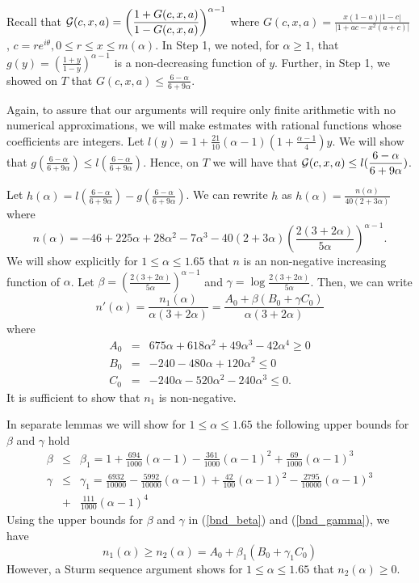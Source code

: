 \documentclass[12pt]{article}
\newcommand{\ds}{\displaystyle}
\begin{document}
Recall that ${\ds {\cal G}(c,x,a) = \left ( \frac{1+G(c,x,a)}{1-G(c,x,a)} \right ) ^{\alpha-1}}$ where  
${\ds G(c,x,a) = \frac{x(1-a)|1-c|}{|1+ac-x^2(a+c)|}}$, $c = re^{i\theta}, 0 \le r \le x \le m(\alpha)$. 
In Step 1, we noted, for $\alpha \ge 1$, that 
${\ds g(y) = \left ( \frac{1+y}{1-y} \right ) ^{\alpha-1}}$  is a non-decreasing function of $y$.  
Further, in Step 1, we showed on $T$ that ${\ds G(c,x,a) \le \frac{6-\alpha}{6+9\alpha}}$.

Again, to assure that our arguments will require only finite arithmetic with no numerical approximations, we will make estmates with rational functions whose coefficients are integers. Let ${\ds l(y) = 1 +\frac{21}{10}(\alpha-1)(1+\frac{\alpha-1}{4})y}$. We will show that ${\ds g(\frac{6-\alpha}{6+9\alpha}) \le l(\frac{6-\alpha}{6+9\alpha})}$.  Hence, on $T$ we will have that ${\ds {\cal G}(c,x,a) \le l(\frac{6-\alpha}{6+9\alpha}})$.

Let ${\ds h(\alpha) = l(\frac{6-\alpha}{6+9\alpha}) - g(\frac{6-\alpha}{6+9\alpha}) }$.  We can rewrite $h$ as 
${\ds h(\alpha) = \frac{n(\alpha)}{40(2+3\alpha)} }$ where
$$
n(\alpha) = -46 + 225\alpha + 28\alpha^2 - 7\alpha^3 -40(2+3\alpha)\left( \frac{2(3+2\alpha)}{5\alpha} \right)^{\alpha-1}.
$$
We will show explicitly for $1 \le \alpha \le 1.65$ that $n$ is an non-negative increasing function of $\alpha$.
Let ${\ds \beta = \left( \frac{2(3+2\alpha)}{5\alpha} \right)^{\alpha-1} }$ and ${\ds \gamma = \log \frac{2(3+2\alpha)}{5\alpha} }$.  Then, we can write
$$
n'(\alpha) = \frac{n_1(\alpha)}{\alpha(3+2\alpha)} =\frac{A_0  + \beta(B_0  +\gamma C_0)}{\alpha(3+2\alpha)}
$$
where
\begin{eqnarray*}
A_0 &=& 675\alpha + 618\alpha^2 +49\alpha^3 -42\alpha^4 \ge 0\\
B_0 &=& -240 -480\alpha+120\alpha^2 \le 0\\
C_0 &=& -240\alpha-520\alpha^2-240\alpha^3 \le 0.
\end{eqnarray*}
It is sufficient to show that $n_1$ is non-negative.

In separate lemmas we will show for $1 \le \alpha \le 1.65$ the following upper bounds for $\beta$ and $\gamma$ hold
\begin{eqnarray} \label{bnd_beta}
\beta &\le& \beta_1 = 1+\frac{694}{1000}(\alpha-1)-\frac{361}{1000}(\alpha-1)^2+\frac{69}{1000}(\alpha-1)^3 \\ \label{bnd_gamma}
\gamma &\le& \gamma_1 = \frac{6932}{10000}-\frac{5992}{10000}(\alpha-1)+\frac{42}{100}(\alpha-1)^2-\frac{2795}{10000}(\alpha-1)^3 \\ \nonumber
&+&\frac{111}{1000}(\alpha-1)^4
\end{eqnarray}
Using the upper bounds for $\beta$ and $\gamma$ in (\ref{bnd_beta}) and (\ref{bnd_gamma}), we have
$$
n_1(\alpha) \ge n_2(\alpha) = A_0 + \beta_1(B_0 + \gamma_1 C_0)
$$
However, a Sturm sequence argument shows for $1 \le \alpha \le 1.65$ that $n_2(\alpha) \ge 0$.
\end{document}
